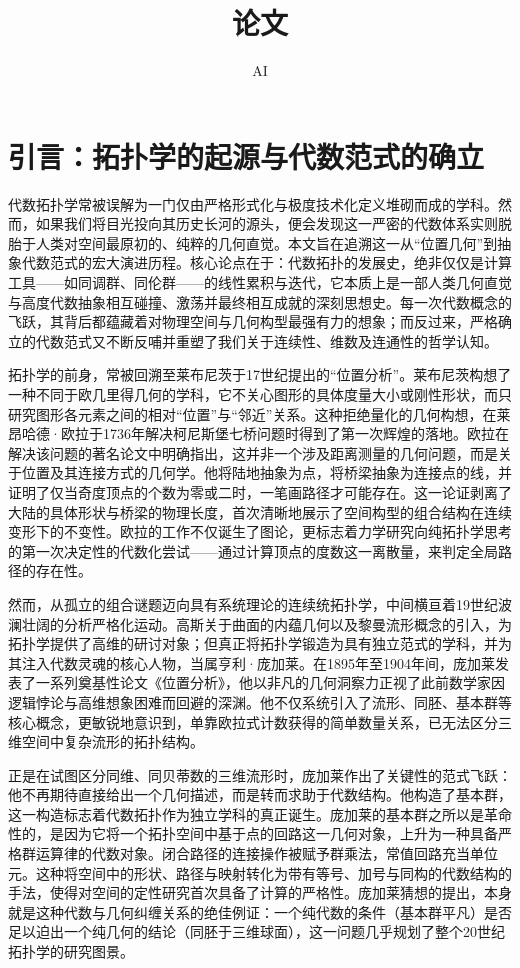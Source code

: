 \documentclass[12pt,a4paper]{article}
\title{论文}
\author{AI}
\begin{document}
\maketitle
\tableofcontents
\newpage
\section{引言：拓扑学的起源与代数范式的确立}

代数拓扑学常被误解为一门仅由严格形式化与极度技术化定义堆砌而成的学科。然而，如果我们将目光投向其历史长河的源头，便会发现这一严密的代数体系实则脱胎于人类对空间最原初的、纯粹的几何直觉。本文旨在追溯这一从“位置几何”到抽象代数范式的宏大演进历程。核心论点在于：代数拓扑的发展史，绝非仅仅是计算工具——如同调群、同伦群——的线性累积与迭代，它本质上是一部人类几何直觉与高度代数抽象相互碰撞、激荡并最终相互成就的深刻思想史。每一次代数概念的飞跃，其背后都蕴藏着对物理空间与几何构型最强有力的想象；而反过来，严格确立的代数范式又不断反哺并重塑了我们关于连续性、维数及连通性的哲学认知。

拓扑学的前身，常被回溯至莱布尼茨于17世纪提出的“位置分析”。莱布尼茨构想了一种不同于欧几里得几何的学科，它不关心图形的具体度量大小或刚性形状，而只研究图形各元素之间的相对“位置”与“邻近”关系。这种拒绝量化的几何构想，在莱昂哈德·欧拉于1736年解决柯尼斯堡七桥问题时得到了第一次辉煌的落地。欧拉在解决该问题的著名论文中明确指出，这并非一个涉及距离测量的几何问题，而是关于位置及其连接方式的几何学。他将陆地抽象为点，将桥梁抽象为连接点的线，并证明了仅当奇度顶点的个数为零或二时，一笔画路径才可能存在。这一论证剥离了大陆的具体形状与桥梁的物理长度，首次清晰地展示了空间构型的组合结构在连续变形下的不变性。欧拉的工作不仅诞生了图论，更标志着力学研究向纯拓扑学思考的第一次决定性的代数化尝试——通过计算顶点的度数这一离散量，来判定全局路径的存在性。

然而，从孤立的组合谜题迈向具有系统理论的连续统拓扑学，中间横亘着19世纪波澜壮阔的分析严格化运动。高斯关于曲面的内蕴几何以及黎曼流形概念的引入，为拓扑学提供了高维的研讨对象；但真正将拓扑学锻造为具有独立范式的学科，并为其注入代数灵魂的核心人物，当属亨利·庞加莱。在1895年至1904年间，庞加莱发表了一系列奠基性论文《位置分析》，他以非凡的几何洞察力正视了此前数学家因逻辑悖论与高维想象困难而回避的深渊。他不仅系统引入了流形、同胚、基本群等核心概念，更敏锐地意识到，单靠欧拉式计数获得的简单数量关系，已无法区分三维空间中复杂流形的拓扑结构。

正是在试图区分同维、同贝蒂数的三维流形时，庞加莱作出了关键性的范式飞跃：他不再期待直接给出一个几何描述，而是转而求助于代数结构。他构造了基本群，这一构造标志着代数拓扑作为独立学科的真正诞生。庞加莱的基本群之所以是革命性的，是因为它将一个拓扑空间中基于点的回路这一几何对象，上升为一种具备严格群运算律的代数对象。闭合路径的连接操作被赋予群乘法，常值回路充当单位元。这种将空间中的形状、路径与映射转化为带有等号、加号与同构的代数结构的手法，使得对空间的定性研究首次具备了计算的严格性。庞加莱猜想的提出，本身就是这种代数与几何纠缠关系的绝佳例证：一个纯代数的条件（基本群平凡）是否足以迫出一个纯几何的结论（同胚于三维球面），这一问题几乎规划了整个20世纪拓扑学的研究图景。
\end{document}
